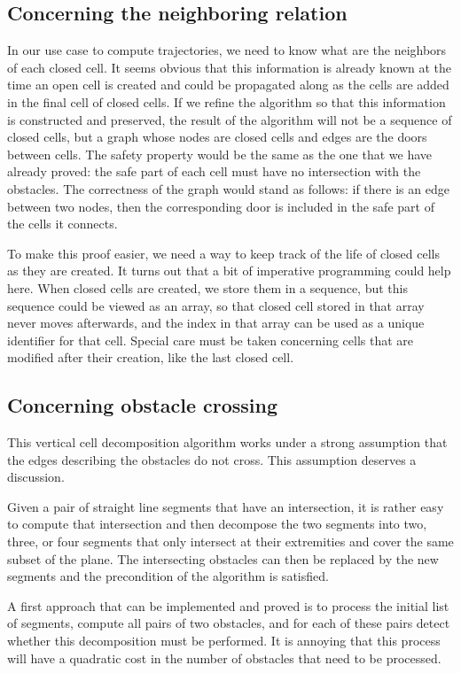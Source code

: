 \documentclass[a4paper, USenglish, cleveref, autoref, thm-restate]{lipics-v2021}
\begin{document}
\subsection{Concerning the neighboring relation}
In our use case to compute trajectories, we need to know what are the
neighbors of each closed cell.  It seems obvious that this information
is already known at the time an open cell is created and could be
propagated along as the cells are added in the final cell of closed
cells.  If we refine the algorithm so that this information is
constructed and preserved, the result of the algorithm will not be a
sequence of closed cells, but a graph whose nodes are closed cells and
edges are the doors between cells.  The safety property would be the
same as the one that we have already proved: the safe part of each
cell must have no intersection with the obstacles.  The correctness of
the graph would stand as follows: if there is an edge between two
nodes, then the corresponding door is included in the safe part of the
cells it connects.

To make this proof easier, we need a way to keep track of the life of
closed cells as they are created.  It turns out that a bit of
imperative programming could help here.  When closed cells are
created, we store them in a sequence, but this sequence could be
viewed as an array, so that closed cell stored in that array never
moves afterwards, and the index in that array can be used as a unique
identifier for that cell.  Special care must be taken concerning cells
that are modified after their creation, like the last closed cell.
\subsection{Concerning obstacle crossing}
This vertical cell decomposition algorithm works under a strong
assumption that the edges describing the obstacles do not cross.  This
assumption deserves a discussion.

Given a pair of straight line segments that have an intersection, it
is rather easy to compute that intersection and then decompose the two
segments into two, three, or four segments that only intersect at
their extremities and cover the same subset of the plane.  The
intersecting obstacles can then be replaced by the new segments and
the precondition of the algorithm is satisfied.

A first approach that can be implemented and
proved is to process the initial list of segments, compute all pairs
of two obstacles, and for each of these pairs detect whether this
decomposition must be performed.  It is annoying that this process
will have a quadratic cost in the number of obstacles that need to be
processed.
\end{document}
